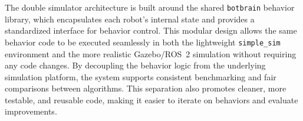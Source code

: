 The double simulator architecture is built around the shared \texttt{botbrain} behavior library, which encapsulates each robot’s internal state and provides a standardized interface for behavior control. This modular design allows the same behavior code to be executed seamlessly in both the lightweight \texttt{simple\_sim} environment and the more realistic Gazebo/ROS~2 simulation without requiring any code changes. By decoupling the behavior logic from the underlying simulation platform, the system supports consistent benchmarking and fair comparisons between algorithms. This separation also promotes cleaner, more testable, and reusable code, making it easier to iterate on behaviors and evaluate improvements.
